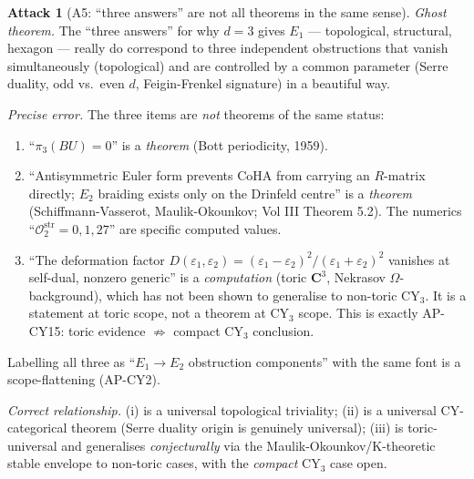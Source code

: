 \documentclass[11pt]{amsart}
\theoremstyle{definition}
\newtheorem{attack}{Attack}
\providecommand{\Eone}{E_1}
\providecommand{\Etwo}{E_2}
\providecommand{\bC}{\mathbf{C}}
\begin{document}
\begin{attack}[A5: ``three answers'' are not all theorems in the same sense]\leavevmode

\noindent\emph{Ghost theorem.} The ``three answers'' for why $d=3$
gives $\Eone$ --- topological, structural, hexagon --- really do
correspond to three independent obstructions that vanish simultaneously
(topological) and are controlled by a common parameter (Serre duality,
odd vs.\ even $d$, Feigin-Frenkel signature) in a beautiful way.

\noindent\emph{Precise error.} The three items are {\em not} theorems
of the same status:

\begin{enumerate}[label=(\roman*)]
 \item ``$\pi_3(BU) = 0$'' is a \emph{theorem} (Bott periodicity, 1959).
 \item ``Antisymmetric Euler form prevents CoHA from carrying an
   $R$-matrix directly; $\Etwo$ braiding exists only on the Drinfeld
   centre'' is a \emph{theorem} (Schiffmann-Vasserot, Maulik-Okounkov;
   Vol III Theorem 5.2). The numerics
   ``$\mathcal{O}_2^{\mathrm{str}} = 0, 1, 27$'' are specific computed
   values.
 \item ``The deformation factor $D(\varepsilon_1, \varepsilon_2) =
   (\varepsilon_1 - \varepsilon_2)^2/(\varepsilon_1 + \varepsilon_2)^2$
   vanishes at self-dual, nonzero generic'' is a \emph{computation}
   (toric $\bC^3$, Nekrasov $\Omega$-background), which has not been
   shown to generalise to non-toric CY$_3$. It is a statement at toric
   scope, not a theorem at CY$_3$ scope. This is exactly AP-CY15:
   toric evidence $\not\Rightarrow$ compact CY$_3$ conclusion.
\end{enumerate}

Labelling all three as ``$\Eone \to \Etwo$ obstruction components''
with the same font is a scope-flattening (AP-CY2).

\noindent\emph{Correct relationship.} (i) is a universal topological
triviality; (ii) is a universal CY-categorical theorem (Serre duality
origin is genuinely universal); (iii) is toric-universal and
generalises {\em conjecturally} via the Maulik-Okounkov/K-theoretic
stable envelope to non-toric cases, with the {\em compact} CY$_3$
case open.

\end{attack}
\end{document}
